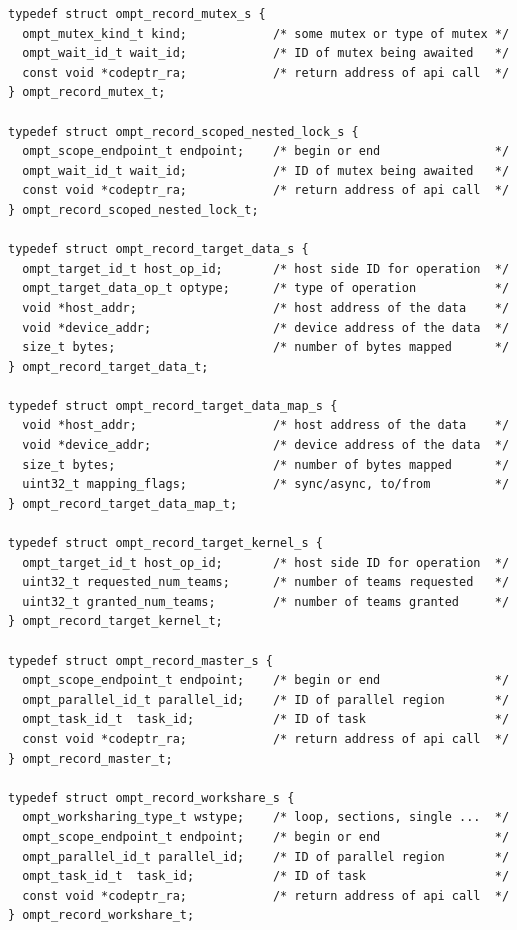 \documentclass{article}
\begin{document}
\begin{verbatim}
typedef struct ompt_record_mutex_s {
  ompt_mutex_kind_t kind;            /* some mutex or type of mutex */
  ompt_wait_id_t wait_id;            /* ID of mutex being awaited   */
  const void *codeptr_ra;            /* return address of api call  */       
} ompt_record_mutex_t;

typedef struct ompt_record_scoped_nested_lock_s {
  ompt_scope_endpoint_t endpoint;    /* begin or end                */
  ompt_wait_id_t wait_id;            /* ID of mutex being awaited   */
  const void *codeptr_ra;            /* return address of api call  */       
} ompt_record_scoped_nested_lock_t;

typedef struct ompt_record_target_data_s {
  ompt_target_id_t host_op_id;       /* host side ID for operation  */
  ompt_target_data_op_t optype;      /* type of operation           */
  void *host_addr;                   /* host address of the data    */
  void *device_addr;                 /* device address of the data  */ 
  size_t bytes;                      /* number of bytes mapped      */
} ompt_record_target_data_t;

typedef struct ompt_record_target_data_map_s {
  void *host_addr;                   /* host address of the data    */
  void *device_addr;                 /* device address of the data  */ 
  size_t bytes;                      /* number of bytes mapped      */
  uint32_t mapping_flags;            /* sync/async, to/from         */
} ompt_record_target_data_map_t;

typedef struct ompt_record_target_kernel_s {
  ompt_target_id_t host_op_id;       /* host side ID for operation  */
  uint32_t requested_num_teams;      /* number of teams requested   */
  uint32_t granted_num_teams;        /* number of teams granted     */
} ompt_record_target_kernel_t;

typedef struct ompt_record_master_s {
  ompt_scope_endpoint_t endpoint;    /* begin or end                */
  ompt_parallel_id_t parallel_id;    /* ID of parallel region       */
  ompt_task_id_t  task_id;           /* ID of task                  */
  const void *codeptr_ra;            /* return address of api call  */
} ompt_record_master_t;

typedef struct ompt_record_workshare_s {
  ompt_worksharing_type_t wstype;    /* loop, sections, single ...  */
  ompt_scope_endpoint_t endpoint;    /* begin or end                */
  ompt_parallel_id_t parallel_id;    /* ID of parallel region       */
  ompt_task_id_t  task_id;           /* ID of task                  */
  const void *codeptr_ra;            /* return address of api call  */
} ompt_record_workshare_t;


\end{verbatim}
\end{document}
